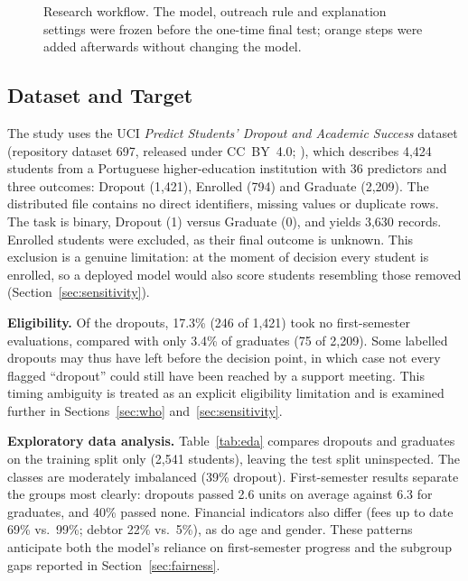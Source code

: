 \begin{figure}[t]
  \caption{Research workflow. The model, outreach rule and explanation settings were frozen before the one-time final test; orange steps were added afterwards without changing the model.}
  \label{fig:project-pipeline}
\end{figure}


\subsection{Dataset and Target}

The study uses the UCI \emph{Predict Students' Dropout and Academic Success} dataset (repository
dataset 697, released under CC~BY~4.0; \citealp{realinho2021uci, realinho2022predicting}), which describes 4,424
students from a Portuguese higher-education institution with 36 predictors and three outcomes:
Dropout (1,421), Enrolled (794) and Graduate (2,209). The distributed file contains no direct
identifiers, missing values or duplicate rows. The task is binary, Dropout (1) versus Graduate (0),
and yields 3,630 records. Enrolled students were excluded, as their final outcome is unknown. This
exclusion is a genuine limitation: at the moment of decision every student is enrolled, so a
deployed model would also score students resembling those removed (Section~\ref{sec:sensitivity}).

\textbf{Eligibility.} Of the dropouts, 17.3\% (246 of 1,421) took no first-semester evaluations,
compared with only 3.4\% of graduates (75 of 2,209). Some labelled dropouts may thus have left
before the decision point, in which case not every flagged ``dropout'' could still have been reached
by a support meeting. This timing ambiguity is treated as an explicit eligibility limitation and is
examined further in Sections~\ref{sec:who} and~\ref{sec:sensitivity}.

\textbf{Exploratory data analysis.} Table~\ref{tab:eda} compares dropouts and graduates on the
training split only (2,541 students), leaving the test split uninspected. The classes are moderately
imbalanced (39\% dropout). First-semester results separate the groups most clearly: dropouts passed
2.6 units on average against 6.3 for graduates, and 40\% passed none. Financial indicators also
differ (fees up to date 69\% vs.\ 99\%; debtor 22\% vs.\ 5\%), as do age and gender. These patterns
anticipate both the model's reliance on first-semester progress and the subgroup gaps reported in
Section~\ref{sec:fairness}.

